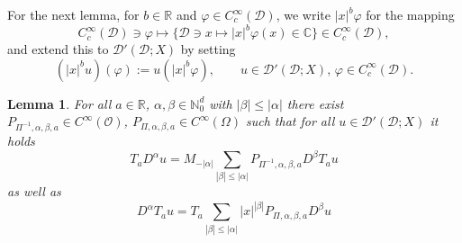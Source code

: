 \documentclass[12pt,a4paper, reqno]{amsart}
\theoremstyle{plain}
\newtheorem{lemma}[theorem]{Lemma}
\theoremstyle{definition}
\theoremstyle{remark}
\numberwithin{equation}{section}
\newcommand{\1}{\mathbbm{1}}
\newcommand{\R}{\ensuremath{\mathbb{R}}}
\newcommand{\N}{\ensuremath{\mathbb{N}}}
\newcommand{\C}{\ensuremath{\mathbb{C}}}
\newcommand{\calO}{\ensuremath{\mathcal{O}}}
\newcommand{\calD}{\ensuremath{\mathcal{D}}}
\newcommand{\scrD}{\ensuremath{\mathscr{D}}}
\begin{document}
For the next lemma, for $b\in \R$ and $\varphi\in C_c^\infty(\calD)$, we write $|x|^b \varphi $ for the mapping 
\[ C_c^\infty(\calD) \ni \varphi \mapsto \{\calD\ni x \mapsto |x|^b\varphi(x) \in \C\}\in C_c^\infty(\calD),\]
and extend this to $\scrD'(\calD;X)$ by setting $$(|x|^b u)(\varphi):=u(|x|^b \varphi), \qquad u\in \scrD'(\calD;X),\,\varphi\in C_c^\infty(\calD).$$
\begin{lemma}\label{lem:DifferentialCalculus:EulerCoordinate}
    For all $a\in \R$, $\alpha,\beta\in \N^d_0$ with $|\beta|\le |\alpha|$ there exist $P_{\Pi^{-1},\alpha,\beta,a}\in C^\infty(\calO)$, $P_{\Pi,\alpha,\beta,a}\in C^\infty(\Omega)$ such that   for all $u\in \scrD'(\calD;X)$ it holds 
    \begin{equation}\label{eq:DifferentialCalculus:EulerCoordinate:1}
        T_a D^\alpha u = M_{-|\alpha|}\sum_{|\beta|\le |\alpha|} P_{\Pi^{-1},\alpha,\beta,a}D^\beta T_a u
    \end{equation}
    as well as 
    \begin{equation}\label{eq:DifferentialCalculus:EulerCoordinate:2}
        D^\alpha T_a u = T_a \sum_{|\beta|\le |\alpha|} |x|^{|\beta|} P_{\Pi,\alpha,\beta,a} D^\beta u
    \end{equation}
\end{lemma}
\end{document}

